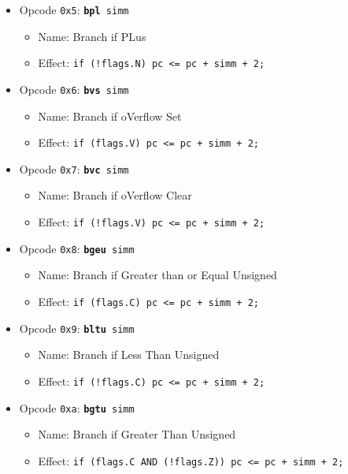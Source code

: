 \documentclass{article}
\begin{document}
\begin{itemize}
		\item Opcode \texttt{0x5}:
			\texttt{\textbf{bpl} simm}
		\begin{itemize}
			\item Name: Branch if PLus
			\item Effect:
				\texttt{if (!flags.N) pc <= pc + simm + 2;}
		\end{itemize}

		\item Opcode \texttt{0x6}:
			\texttt{\textbf{bvs} simm}
		\begin{itemize}
			\item Name: Branch if oVerflow Set
			\item Effect:
				\texttt{if (flags.V) pc <= pc + simm + 2;}
		\end{itemize}

		\item Opcode \texttt{0x7}:
			\texttt{\textbf{bvc} simm}
		\begin{itemize}
			\item Name: Branch if oVerflow Clear
			\item Effect:
				\texttt{if (!flags.V) pc <= pc + simm + 2;}
		\end{itemize}

		\item Opcode \texttt{0x8}:
			\texttt{\textbf{bgeu} simm}
		\begin{itemize}
			\item Name: Branch if Greater than or Equal Unsigned
			\item Effect:
				\texttt{if (flags.C) pc <= pc + simm + 2;}
		\end{itemize}

		\item Opcode \texttt{0x9}:
			\texttt{\textbf{bltu} simm}
		\begin{itemize}
			\item Name: Branch if Less Than Unsigned
			\item Effect:
				\texttt{if (!flags.C) pc <= pc + simm + 2;}
		\end{itemize}

		\item Opcode \texttt{0xa}:
			\texttt{\textbf{bgtu} simm}
		\begin{itemize}
			\item Name: Branch if Greater Than Unsigned
			\item Effect:
				\texttt{if (flags.C AND (!flags.Z)) pc <= pc + simm + 2;}
		\end{itemize}


\end{itemize}
\end{document}
